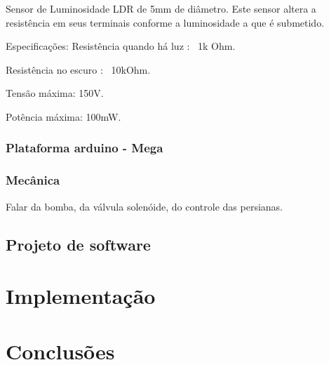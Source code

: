 \documentclass[a4paper,12pt]{report}
\begin{document}
		Sensor de Luminosidade LDR de 5mm de diâmetro. Este sensor altera a resistência em seus terminais conforme a luminosidade a que é submetido.
		
		Especificações:
		Resistência quando há luz : ~1k Ohm.
		
		Resistência no escuro : ~10kOhm.
		
		Tensão máxima: 150V.
		
		Potência máxima: 100mW.
		
		\subsection{Plataforma arduino - Mega}	
		\subsection{Mecânica}
			Falar da bomba, da válvula solenóide, do controle das persianas.	
	
		
	\section{Projeto de software}
		
\chapter{Implementação}

\chapter{Conclusões}

 
 

	
	
	
	
	
	
	
	
	
	
	
	
		
	
	
	
\end{document}
